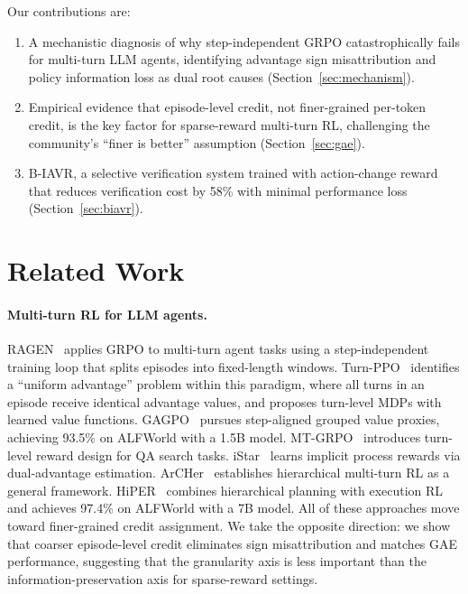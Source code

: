 \documentclass[10pt]{article}
\newcommand{\ours}{B-IAVR}
\begin{document}
Our contributions are:
\begin{enumerate}
    \item A mechanistic diagnosis of why step-independent GRPO catastrophically fails for multi-turn LLM agents, identifying advantage sign misattribution and policy information loss as dual root causes (Section~\ref{sec:mechanism}).
    \item Empirical evidence that episode-level credit, not finer-grained per-token credit, is the key factor for sparse-reward multi-turn RL, challenging the community's ``finer is better'' assumption (Section~\ref{sec:gae}).
    \item \ours{}, a selective verification system trained with action-change reward that reduces verification cost by 58\% with minimal performance loss (Section~\ref{sec:biavr}).
\end{enumerate}

\section{Related Work}

\paragraph{Multi-turn RL for LLM agents.}
RAGEN~\citep{ragen} applies GRPO to multi-turn agent tasks using a step-independent training loop that splits episodes into fixed-length windows. Turn-PPO~\citep{turnppo} identifies a ``uniform advantage'' problem within this paradigm, where all turns in an episode receive identical advantage values, and proposes turn-level MDPs with learned value functions. GAGPO~\citep{gagpo} pursues step-aligned grouped value proxies, achieving 93.5\% on ALFWorld with a 1.5B model. MT-GRPO~\citep{mtgrpo} introduces turn-level reward design for QA search tasks. iStar~\citep{istar} learns implicit process rewards via dual-advantage estimation. ArCHer~\citep{archer} establishes hierarchical multi-turn RL as a general framework. HiPER~\citep{hiper} combines hierarchical planning with execution RL and achieves 97.4\% on ALFWorld with a 7B model. All of these approaches move toward finer-grained credit assignment. We take the opposite direction: we show that coarser episode-level credit eliminates sign misattribution and matches GAE performance, suggesting that the granularity axis is less important than the information-preservation axis for sparse-reward settings.
\end{document}
